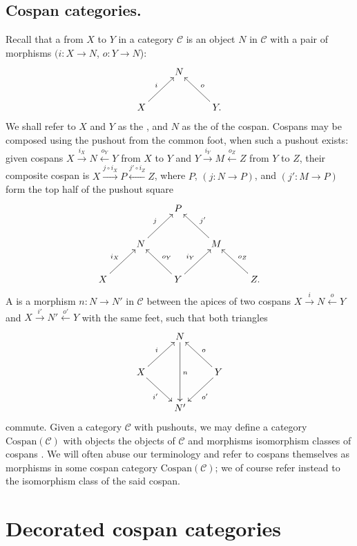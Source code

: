 \subsection{Cospan categories.}
Recall that a  from $X$ to $Y$ in a category $\mathcal C$ is an
object $N$ in $\mathcal C$ with a pair of morphisms $(i\colon  X \to N$, $o\colon  Y \to
N$):
\[
  \xymatrix{
    & N \\
    X \ar[ur]^{i} && Y. \ar[ul]_{o}
  }
\]
We shall refer to $X$ and $Y$ as the , and $N$ as the
 of the cospan.  Cospans may be composed using the pushout from
the common foot, when such a pushout exists: given cospans $X
\stackrel{i_X}{\longrightarrow} N \stackrel{o_Y}{\longleftarrow} Y$ from $X$ to
$Y$ and $Y \stackrel{i_Y}{\longrightarrow} M \stackrel{o_Z}{\longleftarrow} Z$
from $Y$ to $Z$, their composite cospan is $X \stackrel{j \circ
i_X}{\longrightarrow} P \stackrel{j'\circ i_Z}{\longleftarrow} Z$, where $P$,
$(j\colon  N \to P)$, and $(j'\colon  M \to P)$ form the top half of the pushout square
\[
  \xymatrix{
    && P \\
    & N \ar[ur]^j && M \ar[ul]_{j'} \\
    X \ar[ur]^{i_X} && Y \ar[ul]_{o_Y} \ar[ur]^{i_Y} && Z. \ar[ul]_{o_Z}
  }
\]
A  is a morphism $n\colon  N \to N'$ in $\mathcal C$ between
the apices of two cospans $X \stackrel{i}{\longrightarrow} N
\stackrel{o}{\longleftarrow} Y$ and $X \stackrel{i'}{\longrightarrow} N'
\stackrel{o'}{\longleftarrow} Y$ with the same feet, such that both triangles 
\[
  \xymatrix{
    & N \ar[dd]^n  \\
    X \ar[ur]^{i} \ar[dr]_{i'} && Y \ar[ul]_{o} \ar[dl]^{o'}\\
    & N'
  }
\]
commute. Given a category $\mathcal C$ with pushouts, we may define a category
$\mathrm{Cospan}(\mathcal C)$ with objects the objects of $\mathcal C$ and
morphisms isomorphism classes of cospans \cite{Be}. We will often abuse our
terminology and refer to cospans themselves as morphisms in some cospan
category $\mathrm{Cospan}(\mathcal C)$; we of course refer instead to the
isomorphism class of the said cospan.

\section{Decorated cospan categories} \label{sec:dcc}

